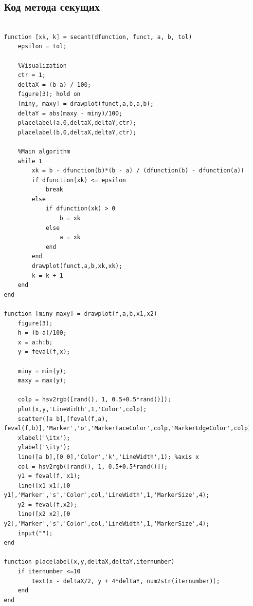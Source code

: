 \documentclass[a4paper,12pt]{article}
\begin{document}
\subsection*{Код метода секущих}
\begin{lstlisting}[style=Matlab-editor, caption=Метод секущих]

function [xk, k] = secant(dfunction, funct, a, b, tol)
    epsilon = tol;
    
    %Visualization
    ctr = 1;
    deltaX = (b-a) / 100;
    figure(3); hold on
    [miny, maxy] = drawplot(funct,a,b,a,b);
    deltaY = abs(maxy - miny)/100;
    placelabel(a,0,deltaX,deltaY,ctr);
    placelabel(b,0,deltaX,deltaY,ctr);
    
    %Main algorithm
    while 1
        xk = b - dfunction(b)*(b - a) / (dfunction(b) - dfunction(a))
        if dfunction(xk) <= epsilon
            break
        else
            if dfunction(xk) > 0
                b = xk
            else
                a = xk
            end
        end
        drawplot(funct,a,b,xk,xk);
        k = k + 1
    end
end

function [miny maxy] = drawplot(f,a,b,x1,x2)
    figure(3); 
    h = (b-a)/100;
    x = a:h:b;
    y = feval(f,x);
    
    miny = min(y);
    maxy = max(y);
    
    colp = hsv2rgb([rand(), 1, 0.5+0.5*rand()]);
    plot(x,y,'LineWidth',1,'Color',colp);
    scatter([a b],[feval(f,a), feval(f,b)],'Marker','o','MarkerFaceColor',colp,'MarkerEdgeColor',colp);
    xlabel('\itx');
    ylabel('\ity');
    line([a b],[0 0],'Color','k','LineWidth',1); %axis x
    col = hsv2rgb([rand(), 1, 0.5+0.5*rand()]);
    y1 = feval(f, x1);
    line([x1 x1],[0 y1],'Marker','s','Color',col,'LineWidth',1,'MarkerSize',4); 
    y2 = feval(f,x2);
    line([x2 x2],[0 y2],'Marker','s','Color',col,'LineWidth',1,'MarkerSize',4); 
    input("");
end

function placelabel(x,y,deltaX,deltaY,iternumber)
    if iternumber <=10
        text(x - deltaX/2, y + 4*deltaY, num2str(iternumber));
    end
end

\end{lstlisting}
\end{document}
